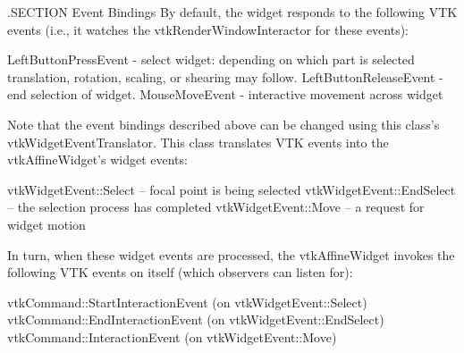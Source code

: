 .S\-E\-C\-T\-I\-O\-N Event Bindings By default, the widget responds to the following V\-T\-K events (i.\-e., it watches the vtk\-Render\-Window\-Interactor for these events)\-: 
\begin{DoxyPre}
   LeftButtonPressEvent - select widget: depending on which part is selected
                          translation, rotation, scaling, or shearing may follow.
   LeftButtonReleaseEvent - end selection of widget.
   MouseMoveEvent - interactive movement across widget
 \end{DoxyPre}


Note that the event bindings described above can be changed using this class's vtk\-Widget\-Event\-Translator. This class translates V\-T\-K events into the vtk\-Affine\-Widget's widget events\-: 
\begin{DoxyPre}
   vtkWidgetEvent::Select -- focal point is being selected
   vtkWidgetEvent::EndSelect -- the selection process has completed
   vtkWidgetEvent::Move -- a request for widget motion
 \end{DoxyPre}


In turn, when these widget events are processed, the vtk\-Affine\-Widget invokes the following V\-T\-K events on itself (which observers can listen for)\-: 
\begin{DoxyPre}
   vtkCommand::StartInteractionEvent (on vtkWidgetEvent::Select)
   vtkCommand::EndInteractionEvent (on vtkWidgetEvent::EndSelect)
   vtkCommand::InteractionEvent (on vtkWidgetEvent::Move)
 \end{DoxyPre}



